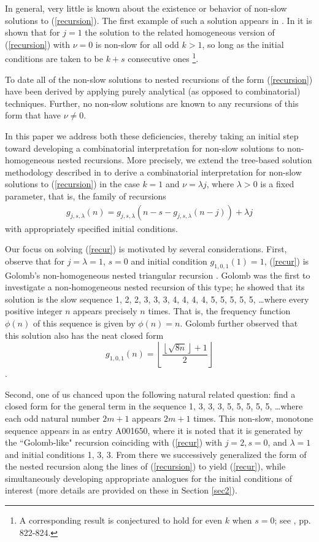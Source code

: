 \documentclass[12pt]{amsart}
\numberwithin{equation}{section}
\numberwithin{theorem}{section}
\numberwithin{table}{section}
\numberwithin{figure}{section}
\begin{document}
In general, very little is known about the existence or behavior of non-slow solutions to (\ref{recursion}). The first example of such a solution appears in \cite{HiTan}. In \cite{CCT} it is shown that for $j=1$ the solution to the related homogeneous version of (\ref{recursion}) with $\nu=0$ is non-slow for all odd $k>1$, so long as the initial conditions are taken to be $k+s$ consecutive ones \footnote{A corresponding result is conjectured to hold for even $k$ when $s=0$; see \cite{CCT}, pp. 822-824.}.

To date all of the non-slow solutions to nested recursions of the form (\ref{recursion}) have been derived by applying purely analytical (as opposed to combinatorial) techniques. Further, no non-slow solutions are known to any recursions of this form that have $\nu \neq 0$.

In this paper we address both these deficiencies, thereby taking an initial step toward developing a combinatorial interpretation for non-slow solutions to non-homogeneous nested recursions. More precisely, we extend the tree-based solution methodology described in \cite{NonHomog} to derive a combinatorial interpretation for non-slow solutions to (\ref{recursion}) in the case $k=1$ and $\nu=\lambda j$, where $\lambda>0$ is a fixed parameter, that is, the family of recursions
\begin{align}
g_{j,s,\lambda}(n) = g_{j,s,\lambda}(n - s - g_{j,s,\lambda}(n-j)) + \lambda j
\label{recur}
\end{align}
with appropriately specified initial conditions.

Our focus on solving (\ref{recur}) is motivated by several considerations. First, observe that for $j=\lambda=1$, $s=0$ and initial condition $g_{1,0,1}(1)=1$, (\ref{recur}) is Golomb's non-homogeneous nested triangular recursion \cite{Golomb1990}. Golomb was the first to investigate a non-homogeneous nested recursion of this type; he showed that its solution is the slow sequence 1, 2, 2, 3, 3, 3, 4, 4, 4, 4, 5, 5, 5, 5, 5, \ldots where every positive integer $n$ appears precisely $n$ times. That is, the frequency function $\phi(n)$ of this sequence is given by $\phi(n) = n$. Golomb further observed that this solution also has the neat closed form \begin{equation} g_{1,0,1}(n) = \left\lfloor \frac{ \left\lfloor \sqrt{8n} \right\rfloor + 1}{2}\right\rfloor \label{closed} \end{equation}.

Second, one of us chanced upon the following natural related question: find a closed form for the general term in the sequence 1, 3, 3, 3, 5, 5, 5, 5, 5, \ldots where each odd natural number $2m+1$ appears $2m+1$ times. This non-slow, monotone sequence appears in \cite{sna} as entry A001650, where it is noted that it is generated by the ``Golomb-like" recursion coinciding with (\ref{recur}) with $j=2, s=0$, and $\lambda = 1$ and initial conditions 1, 3, 3. From there we successively generalized the form of the nested recursion along the lines of (\ref{recursion}) to yield (\ref{recur}), while simultaneously developing appropriate analogues for the initial conditions of interest (more details are provided on these in Section \ref{sec2}).
\end{document}
